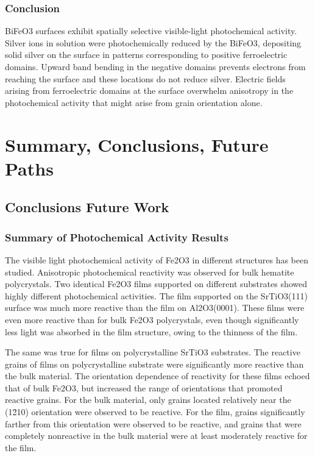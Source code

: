 \documentclass[12pt,%
              twoside,
               letterpaper]{uiothesis}
\begin{document}
\section{Conclusion}\label{sec:ch7conclusion}

BiFeO3 surfaces exhibit spatially selective visible-light photochemical activity.
Silver ions in solution were photochemically reduced by the BiFeO3, depositing solid
silver on the surface in patterns corresponding to positive ferroelectric domains. Upward
band bending in the negative domains prevents electrons from reaching the surface and
these locations do not reduce silver. Electric fields arising from ferroelectric domains
at the surface overwhelm anisotropy in the photochemical activity that might arise from
grain orientation alone.
		
		
	\part{Summary, Conclusions, \oldand Future Paths}


\chapter{Conclusions \oldand Future Work}
\label{ch:conclusions}


\section{Summary of Photochemical Activity
Results}\label{sec:conclusions.photochemc.summary}


The visible light photochemical activity of Fe2O3 in different structures has been
studied. Anisotropic photochemical reactivity was observed for bulk hematite polycrystals. 
Two identical Fe2O3 films supported on different substrates showed highly
different photochemical activities. The film supported on the SrTiO3(111) surface was
much more reactive than the film on Al2O3(0001). These films were even more reactive than
for bulk Fe2O3 polycrystals, even though significantly less light was absorbed in the
film structure, owing to the thinness of the film. 

The same was true for films on polycrystalline SrTiO3 substrates. The reactive grains
of films on polycrystalline substrate were significantly more reactive than the bulk
material. The orientation dependence of reactivity for these films echoed that of bulk
Fe2O3, but increased the range of orientations that promoted reactive grains. For the
bulk material, only grains located relatively near the (1\={2}10) orientation were
observed to be reactive. For the film, grains significantly farther from this orientation
were observed to be reactive, and grains that were completely nonreactive in the bulk
material were at least moderately reactive for the film.
\end{document}
